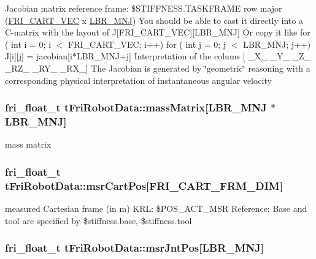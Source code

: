 \-Jacobian matrix reference frame\-: \$\-S\-T\-I\-F\-F\-N\-E\-S\-S.\-T\-A\-S\-K\-F\-R\-A\-M\-E row major (\hyperlink{friComm_8h_a1286cc3f1315de7fac9fed0e6e4b98cb}{\-F\-R\-I\-\_\-\-C\-A\-R\-T\-\_\-\-V\-E\-C} x \hyperlink{friComm_8h_a14d10dff3deb8105d27539540b23ed6e}{\-L\-B\-R\-\_\-\-M\-N\-J}) \-You should be able to cast it directly into a \-C-\/matrix with the layout of \-J\mbox{[}\-F\-R\-I\-\_\-\-C\-A\-R\-T\-\_\-\-V\-E\-C\mbox{]}\mbox{[}\-L\-B\-R\-\_\-\-M\-N\-J\mbox{]} \-Or copy it like for ( int i = 0; i $<$ \-F\-R\-I\-\_\-\-C\-A\-R\-T\-\_\-\-V\-E\-C; i++) for ( int j = 0; j $<$ \-L\-B\-R\-\_\-\-M\-N\-J; j++) \-J\mbox{[}i\mbox{]}\mbox{[}j\mbox{]} = jacobian\mbox{[}i$\ast$\-L\-B\-R\-\_\-\-M\-N\-J+j\mbox{]} \-Interpretation of the colums \mbox{[} \-\_\-\-X\-\_\- \-\_\-\-Y\-\_\- \-\_\-\-Z\-\_\- \-\_\-\-R\-Z\-\_\- \-\_\-\-R\-Y\-\_\- \-\_\-\-R\-X\-\_\-\mbox{]} \-The \-Jacobian is generated by \char`\"{}geometric\char`\"{} reasoning with a corresponding physical interpretation of instantaneous angular velocity \hypertarget{structtFriRobotData_a864e694c1bd10f4240c0973649ea1bbd}{
\subsubsection[{mass\-Matrix}]{\setlength{\rightskip}{0pt plus 5cm}fri\-\_\-float\-\_\-t {\bf t\-Fri\-Robot\-Data\-::mass\-Matrix}\mbox{[}{\bf \-L\-B\-R\-\_\-\-M\-N\-J} $\ast${\bf \-L\-B\-R\-\_\-\-M\-N\-J}\mbox{]}}}\label{structtFriRobotData_a864e694c1bd10f4240c0973649ea1bbd}
mass matrix \hypertarget{structtFriRobotData_ad29ad61ad67d309dbbf0e2dbd67777ff}{
\subsubsection[{msr\-Cart\-Pos}]{\setlength{\rightskip}{0pt plus 5cm}fri\-\_\-float\-\_\-t {\bf t\-Fri\-Robot\-Data\-::msr\-Cart\-Pos}\mbox{[}{\bf \-F\-R\-I\-\_\-\-C\-A\-R\-T\-\_\-\-F\-R\-M\-\_\-\-D\-I\-M}\mbox{]}}}\label{structtFriRobotData_ad29ad61ad67d309dbbf0e2dbd67777ff}
measured \-Cartesian frame (in m) \-K\-R\-L\-: \$\-P\-O\-S\-\_\-\-A\-C\-T\-\_\-\-M\-S\-R \-Reference\-: \-Base and tool are specified by \$stiffness.\-base, \$stiffness.\-tool \hypertarget{structtFriRobotData_ac1bc280d5749a629d8e9e8615c3d37ea}{
\subsubsection[{msr\-Jnt\-Pos}]{\setlength{\rightskip}{0pt plus 5cm}fri\-\_\-float\-\_\-t {\bf t\-Fri\-Robot\-Data\-::msr\-Jnt\-Pos}\mbox{[}{\bf \-L\-B\-R\-\_\-\-M\-N\-J}\mbox{]}}}\label{structtFriRobotData_ac1bc280d5749a629d8e9e8615c3d37ea}
